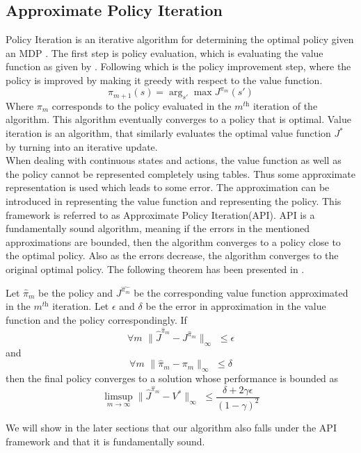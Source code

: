 \documentclass[wcp]{jmlr}
\begin{document}
\subsection{Approximate Policy Iteration}
\label{sec:api}
Policy Iteration is an iterative algorithm for determining the optimal policy given an MDP \citep{rlbook}. The first step is policy evaluation, which is evaluating the value function as given by . Following which is the policy improvement step, where the policy is improved by making it greedy with respect to the value function. 
\[ \pi_{m+1}(s) = \arg_{s'} \max J^{\pi_m}(s') \]
Where $\pi_m$ corresponds to the policy evaluated in the $m^{\textit{th}}$ iteration of the algorithm. This algorithm eventually converges to a policy that is optimal. Value iteration is an algorithm, that similarly evaluates the optimal value function $J^{*}$ by turning  into an iterative update.\\
When dealing with continuous states and actions, the value function as well as the policy cannot be represented completely using tables. Thus some approximate representation is used which leads to some error. The approximation can be introduced in representing the value function and representing the policy. This framework is referred to as Approximate Policy Iteration(API). API is a fundamentally sound algorithm, meaning if the errors in the mentioned approximations are bounded, then the algorithm converges to a policy close to the optimal policy. Also as the errors decrease, the algorithm converges to the original optimal policy. The following theorem has been presented in \citep{neurodp}. 
\begin{theorem}
Let $\hat{\pi}_m$ be the policy and $J^{\hat{\pi_m}}$ be the corresponding value function approximated in the $m^{\textit{th}}$ iteration. Let $\epsilon$ and $\delta$ be the error in approximation in the value function and the policy correspondingly. If
\[ \forall m\,\, \parallel \hat{J}^{\hat{\pi}_m} - J^{\hat{\pi}_m} \parallel_{ \infty }\,\, \leq \epsilon \] and 
\[ \forall m\,\, \parallel \hat{\pi}_m - \pi_m \parallel_{ \infty } \,\,\leq \delta \]
then the final policy converges to a solution whose performance is bounded as
\[ \limsup_{m\rightarrow \infty} \parallel \hat{J}^{\hat{\pi}_m} - V^{*} \parallel_{ \infty }\,\, \leq \dfrac{\delta + 2 \gamma \epsilon}{(1-\gamma )^2} \]
\end{theorem}
We will show in the later sections that our algorithm also falls under the API framework and that it is fundamentally sound.
\end{document}
